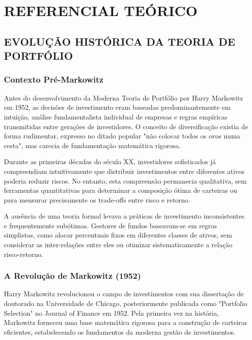 
\chapter{REFERENCIAL TEÓRICO}

\section{EVOLUÇÃO HISTÓRICA DA TEORIA DE PORTFÓLIO}

\subsection{Contexto Pré-Markowitz}

Antes do desenvolvimento da Moderna Teoria de Portfólio por Harry Markowitz em 1952, as decisões de investimento eram baseadas predominantemente em intuição, análise fundamentalista individual de empresas e regras empíricas transmitidas entre gerações de investidores. O conceito de diversificação existia de forma rudimentar, expresso no ditado popular "não colocar todos os ovos numa cesta", mas carecia de fundamentação matemática rigorosa.

Durante as primeiras décadas do século XX, investidores sofisticados já compreendiam intuitivamente que distribuir investimentos entre diferentes ativos poderia reduzir riscos. No entanto, esta compreensão permanecia qualitativa, sem ferramentas quantitativas para determinar a composição ótima de carteiras ou para mensurar precisamente os trade-offs entre risco e retorno.

A ausência de uma teoria formal levava a práticas de investimento inconsistentes e frequentemente subótimas. Gestores de fundos baseavam-se em regras simplistas, como alocar percentuais fixos em diferentes classes de ativos, sem considerar as inter-relações entre eles ou otimizar sistematicamente a relação risco-retorno.

\subsection{A Revolução de Markowitz (1952)}

Harry Markowitz revolucionou o campo de investimentos com sua dissertação de doutorado na Universidade de Chicago, posteriormente publicada como "Portfolio Selection" no Journal of Finance em 1952. Pela primeira vez na história, Markowitz forneceu uma base matemática rigorosa para a construção de carteiras eficientes, estabelecendo os fundamentos da moderna gestão de investimentos.

